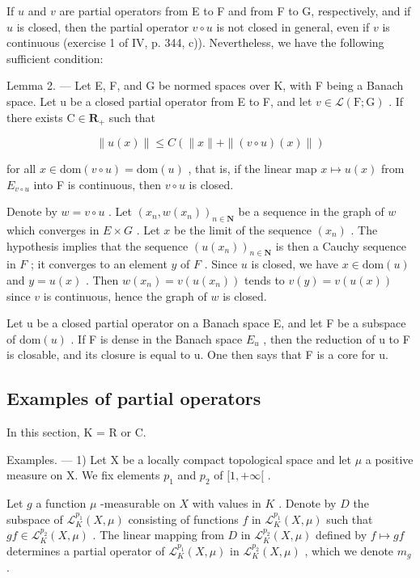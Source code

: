If \(u\) and \(v\) are partial operators from E to F and from F to G, respectively, and if \(u\) is closed, then the partial operator \(v \circ u\) is not closed in general, even if \(v\) is continuous (exercise 1 of IV, p. 344, c)). Nevertheless, we have the following sufficient condition:

Lemma 2. --- Let E, F, and G be normed spaces over K, with F being a Banach space. Let u be a closed partial operator from E to F, and let \(v \in \mathcal{L}(\mathrm{F};\mathrm{G})\) . If there exists \(\mathrm{C} \in \mathbf{R}_{+}\) such that

\[
\| u (x) \| \leqslant C (\| x \| + \| (v \circ u) (x) \|)
\]

for all \(x \in \text{dom}(v \circ u) = \text{dom}(u)\) , that is, if the linear map \(x \mapsto u(x)\) from \(E_{v \circ u}\) into F is continuous, then \(v \circ u\) is closed.

Denote by \(w = v \circ u\) . Let \((x_n, w(x_n))_{n \in \mathbf{N}}\) be a sequence in the graph of \(w\) which converges in \(E \times G\) . Let \(x\) be the limit of the sequence \((x_n)\) . The hypothesis implies that the sequence \((u(x_n))_{n \in \mathbf{N}}\) is then a Cauchy sequence in \(F\) ; it converges to an element \(y\) of \(F\) . Since \(u\) is closed, we have \(x \in \text{dom}(u)\) and \(y = u(x)\) . Then \(w(x_n) = v(u(x_n))\) tends to \(v(y) = v(u(x))\) since \(v\) is continuous, hence the graph of \(w\) is closed.

Let u be a closed partial operator on a Banach space E, and let F be a subspace of \(\text{dom}(u)\) . If F is dense in the Banach space \(E_{u}\) , then the reduction of u to F is closable, and its closure is equal to u. One then says that F is a core for u.

\subsection{Examples of partial operators}

In this section, K = R or C.

Examples. --- 1) Let X be a locally compact topological space and let \(\mu\) a positive measure on X. We fix elements \(p_1\) and \(p_2\) of \([1, +\infty[\) .

Let \(g\) a function \(\mu\) -measurable on \(X\) with values in \(K\) . Denote by \(D\) the subspace of \(\mathcal{L}_{K}^{p_1}(X, \mu)\) consisting of functions \(f\) in \(\mathcal{L}_{K}^{p_1}(X, \mu)\) such that \(gf \in \mathcal{L}_{K}^{p_2}(X, \mu)\) . The linear mapping from \(D\) in \(\mathcal{L}_{K}^{p_2}(X, \mu)\) defined by \(f \mapsto gf\) determines a partial operator of \(\mathcal{L}_{K}^{p_1}(X, \mu)\) in \(\mathcal{L}_{K}^{p_2}(X, \mu)\) , which we denote \(m_g\) .

